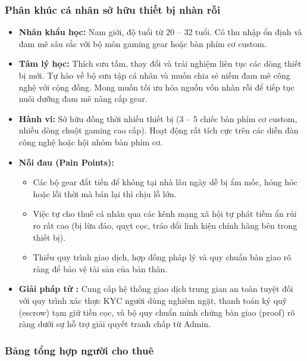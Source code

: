 \subsubsection{Phân khúc cá nhân sở hữu thiết bị nhàn rỗi}
\begin{itemize}
    \item \textbf{Nhân khẩu học:} Nam giới, độ tuổi từ 20 -- 32 tuổi. Có thu nhập ổn định và đam mê sâu sắc với bộ môn gaming gear hoặc bàn phím cơ custom.
    \item \textbf{Tâm lý học:} Thích sưu tầm, thay đổi và trải nghiệm liên tục các dòng thiết bị mới. Tự hào về bộ sưu tập cá nhân và muốn chia sẻ niềm đam mê công nghệ với cộng đồng. Mong muốn tối ưu hóa nguồn vốn nhàn rỗi để tiếp tục nuôi dưỡng đam mê nâng cấp gear.
    \item \textbf{Hành vi:} Sở hữu đồng thời nhiều thiết bị (3 -- 5 chiếc bàn phím cơ custom, nhiều dòng chuột gaming cao cấp). Hoạt động rất tích cực trên các diễn đàn công nghệ hoặc hội nhóm bàn phím cơ.
    \item \textbf{Nỗi đau (Pain Points):}
    \begin{itemize}
        \item Các bộ gear đắt tiền để không tại nhà lâu ngày dễ bị ẩm mốc, hỏng hóc hoặc lỗi thời mà bán lại thì chịu lỗ lớn.
        \item Việc tự cho thuê cá nhân qua các kênh mạng xã hội tự phát tiềm ẩn rủi ro rất cao (bị lừa đảo, quỵt cọc, tráo đổi linh kiện chính hãng bên trong thiết bị).
        \item Thiếu quy trình giao dịch, hợp đồng pháp lý và quy chuẩn bàn giao rõ ràng để bảo vệ tài sản của bản thân.
    \end{itemize}
    \item \textbf{Giải pháp từ \projectname{}:} Cung cấp hệ thống giao dịch trung gian an toàn tuyệt đối với quy trình xác thực KYC người dùng nghiêm ngặt, thanh toán ký quỹ (escrow) tạm giữ tiền cọc, và bộ quy chuẩn minh chứng bàn giao (proof) rõ ràng dưới sự hỗ trợ giải quyết tranh chấp từ Admin.
\end{itemize}

\subsubsection{Bảng tổng hợp người cho thuê}

